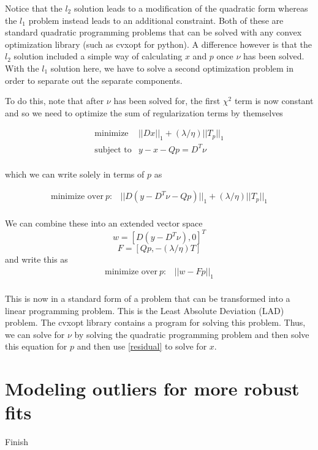 \documentclass{article}
\begin{document}
Notice that the $l_2$ solution leads to a modification of the quadratic form whereas the
$l_1$ problem instead leads to an additional constraint. Both of these are standard quadratic
programming problems that can be solved with any convex optimization library (such as cvxopt for python).
A difference however is that the $l_2$ solution included a simple way of calculating $x$ and $p$ once
$\nu$ has been solved. With the $l_1$ solution here, we have to solve a second optimization problem
in order to separate out the separate components.

To do this, note that after $\nu$ has been solved for, the first $\chi^2$ term is now constant
and so we need to optimize the sum of regularization terms by themselves

\begin{eqnarray}
\mbox{minimize} & ||D x||_1 + (\lambda / \eta) ||T_p||_1 \\
\mbox{subject to} & y - x - Qp = D^T \nu \\
\end{eqnarray}

which we can write solely in terms of $p$ as

\begin{eqnarray}
\mbox{minimize over} ~p : & ||D (y - D^T \nu - Q p)||_1 + (\lambda / \eta) ||T_p||_1 \\
\end{eqnarray}

We can combine these into an extended vector space
\[
w = [D (y - D^T \nu), 0]^T
\]
\[
F = [Q p, -(\lambda/\eta) T]
\]
and write this as
\begin{eqnarray}
\mbox{minimize over}~ p : & ||w-F p||_1 \\
\end{eqnarray}

This is now in a standard form of a problem that can be transformed into a linear programming problem. This is
the Least Absolute Deviation (LAD) problem. The cvxopt library contains a program for solving this problem. Thus,
we can solve for $\nu$ by solving the quadratic programming problem and then solve this equation for $p$ and then
use \ref{residual} to solve for $x$.

\section{Modeling outliers for more robust fits}
Finish
\end{document}
